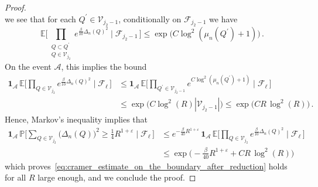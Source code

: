 \documentclass[11pt]{amsart}
\theoremstyle{definition}
\theoremstyle{remark}
\numberwithin{equation}{section}
\def\eps{{\varepsilon}}
\newcommand{\bP}{\mathbb P}
\newcommand{\bE}{\mathbb E}
\begin{document}
\begin{proof}
\[		\]
		we see that for each $Q^\prime\in \mathcal{V}_{j_2-1}$, conditionally on $\mathcal{F}_{j_2-1}$ we have
		\[
		\bE\Big[\prod_{\substack{Q\subset Q^\prime \\ Q\in \mathcal{V}_{j_2}}} e^{\frac{\beta}{10} \Delta_n(Q)^2} \mid \mathcal{F}_{j_2-1} \, \Big] \le \exp \Big(C \log^2(\mu_n(Q^\prime)+1)\Big) \, .
		\]
		On the event $\mathcal{A}$, this implies the bound
		\begin{align*}
			\mathbf{1}_{\mathcal{A}} \, \bE\Big[\prod_{Q\in \mathcal{V}_{j_2}} e^{\frac{\beta}{10} \Delta_n(Q)^2} \mid \mathcal{F}_{\ell} \, \Big] &\le \mathbf{1}_{\mathcal{A}} \, \bE\Big[\prod_{Q^\prime\in \mathcal{V}_{j_2-1}}e^{C\log^2(\mu_n(Q^\prime) + 1)} \mid \mathcal{F}_{\ell} \, \Big] \\ & \le \exp\Big(C\log^2(R) |\mathcal{V}_{j_2-1}|\Big) \le \exp\Big(CR \, \log^2(R) \Big) \, .
		\end{align*}
		Hence, Markov's inequality implies that
		\begin{align*}
			\mathbf{1}_{\mathcal{A}} \, \bP\Big[\sum_{Q\in \mathcal{V}_{j_2}} \big(\Delta_n(Q)\big)^2 \ge \tfrac{1}{4} R^{1+\eps} \mid \mathcal{F}_\ell \, \Big] &\le e^{-\frac{\beta}{40} R^{1+\eps}} \, \mathbf{1}_{\mathcal{A}} \, \bE\Big[\prod_{Q\in \mathcal{V}_{j_2}} e^{\frac{\beta}{10} \Delta_n(Q)^2} \mid \mathcal{F}_{\ell} \, \Big] \\ & \le \exp\Big(-\frac{\beta}{40} R^{1+\eps} + CR \, \log^2(R)\Big)
		\end{align*}
		which proves~\eqref{eq:cramer_estimate_on_the_boundary_after_reduction} holds for all $R$ large enough, and we conclude the proof.
	\end{proof}
\end{document}
